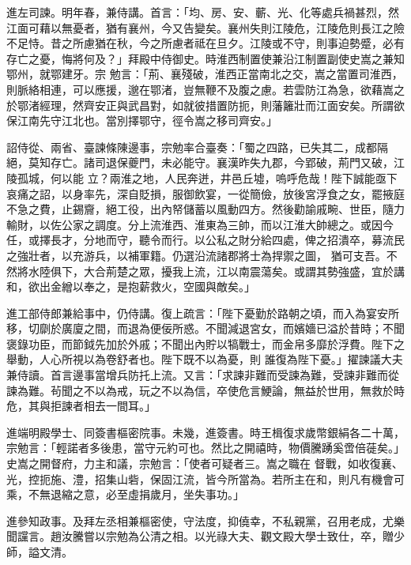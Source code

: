 \begin{pinyinscope}
 進左司諫。明年春，兼侍講。首言：「均、房、安、蘄、光、化等處兵禍甚烈，然江面可藉以無憂者，猶有襄州，今又告變矣。襄州失則江陵危，江陵危則長江之險不足恃。昔之所慮猶在秋，今之所慮者祗在旦夕。江陵或不守，則事迫勢蹙，必有存亡之憂，悔將何及？」拜殿中侍御史。時淮西制置使兼沿江制置副使史嵩之兼知鄂州，就鄂建牙。宗
 勉言：「荊、襄殘破，淮西正當南北之交，嵩之當置司淮西，則脈絡相連，可以應援，邈在鄂渚，豈無鞭不及腹之慮。若雲防江為急，欲藉嵩之於鄂渚經理，然齊安正與武昌對，如就彼措置防扼，則藩籬壯而江面安矣。所謂欲保江南先守江北也。當別擇鄂守，徑令嵩之移司齊安。」



 詔侍從、兩省、臺諫條陳邊事，宗勉率合臺奏：「蜀之四路，已失其二，成都隔絕，莫知存亡。諸司退保夔門，未必能守。襄漢昨失九郡，今郢破，荊門又破，江陵孤城，何以能
 立？兩淮之地，人民奔迸，井邑丘墟，嗚呼危哉！陛下誠能亟下哀痛之詔，以身率先，深自貶損，服御飲宴，一從簡儉，放後宮浮食之女，罷掖庭不急之費，止錫齎，絕工役，出內帑儲蓄以風動四方。然後勸諭戚畹、世臣，隨力輸財，以佐公家之調度。分上流淮西、淮東為三帥，而以江淮大帥總之。或因今任，或擇長才，分地而守，聽令而行。以公私之財分給四處，俾之招潰卒，募流民之強壯者，以充游兵，以補軍籍。仍選沿流諸郡將士為捍禦之圖，
 猶可支吾。不然將水陸俱下，大合荊楚之眾，擾我上流，江以南震蕩矣。或謂其勢強盛，宜於講和，欲出金繒以奉之，是抱薪救火，空國與敵矣。」



 進工部侍郎兼給事中，仍侍講。復上疏言：「陛下憂勤於路朝之頃，而入為宴安所移，切劘於廣廈之間，而退為便佞所惑。不聞減退宮女，而嬪嬙已溢於昔時；不聞褒錄功臣，而節鉞先加於外戚；不聞出內貯以犒戰士，而金帛多靡於浮費。陛下之舉動，人心所視以為卷舒者也。陛下既不以為憂，則
 誰復為陛下憂。」擢諫議大夫兼侍讀。首言邊事當增兵防托上流。又言：「求諫非難而受諫為難，受諫非難而從諫為難。茍聞之不以為戒，玩之不以為信，卒使危言鯁論，無益於世用，無救於時危，其與拒諫者相去一間耳。」



 進端明殿學士、同簽書樞密院事。未幾，進簽書。時王楫復求歲幣銀絹各二十萬，宗勉言：「輕諾者多後患，當守元約可也。然比之開禧時，物價騰踴奚啻倍蓰矣。」史嵩之開督府，力主和議，宗勉言：「使者可疑者三。嵩之職在
 督戰，如收復襄、光，控扼施、澧，招集山砦，保固江流，皆今所當為。若所主在和，則凡有機會可乘，不無退縮之意，必至虛捐歲月，坐失事功。」



 進參知政事。及拜左丞相兼樞密使，守法度，抑僥幸，不私親黨，召用老成，尤樂聞讜言。趙汝騰嘗以宗勉為公清之相。以光祿大夫、觀文殿大學士致仕，卒，贈少師，謚文清。




\end{pinyinscope}

